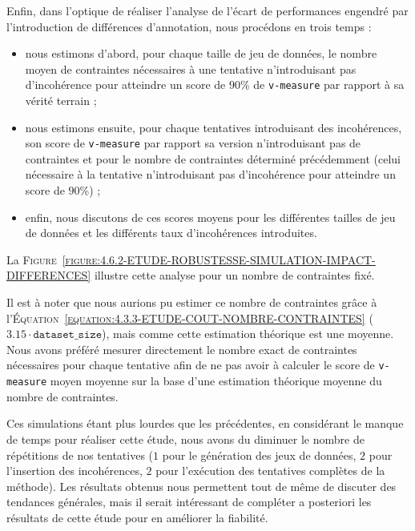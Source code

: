 			Enfin, dans l'optique de réaliser l'analyse de l'écart de performances engendré par l'introduction de différences d'annotation, nous procédons en trois temps :
			\begin{itemize}
				\item nous estimons d'abord, pour chaque taille de jeu de données, le nombre moyen de contraintes nécessaires à une tentative n'introduisant pas d'incohérence pour atteindre un score de $90$\% de \texttt{v-measure} par rapport à sa vérité terrain ;
				\item nous estimons ensuite, pour chaque tentatives introduisant des incohérences, son score de \texttt{v-measure} par rapport sa version n'introduisant pas de contraintes et pour le nombre de contraintes déterminé précédemment (celui nécessaire à la tentative n'introduisant pas d'incohérence pour atteindre un score de $90$\%) ;
				\item enfin, nous discutons de ces scores moyens pour les différentes tailles de jeu de données et les différents taux d'incohérences introduites.
			\end{itemize}
			La \textsc{Figure~\ref{figure:4.6.2-ETUDE-ROBUSTESSE-SIMULATION-IMPACT-DIFFERENCES}} illustre cette analyse pour un nombre de contraintes fixé.
			
			\begin{leftBarAuthorOpinion}
				Il est à noter que nous aurions pu estimer ce nombre de contraintes grâce à l'\textsc{Équation~\ref{equation:4.3.3-ETUDE-COUT-NOMBRE-CONTRAINTES}} ($3.15 \cdot \texttt{dataset\_size}$), mais comme cette estimation théorique est une moyenne.
				Nous avons préféré mesurer directement le nombre exact de contraintes nécessaires pour chaque tentative afin de ne pas avoir à calculer le score de \texttt{v-measure} moyen moyenne sur la base d'une estimation théorique moyenne du nombre de contraintes.
			\end{leftBarAuthorOpinion}
			
			\begin{leftBarWarning}
				Ces simulations étant plus lourdes que les précédentes, en considérant le manque de temps pour réaliser cette étude, nous avons du diminuer le nombre de répétitions de nos tentatives ($1$ pour le génération des jeux de données, $2$ pour l'insertion des incohérences, $2$ pour l’exécution des tentatives complètes de la méthode).
				Les résultats obtenus nous permettent tout de même de discuter des tendances générales, mais il serait intéressant de compléter a posteriori les résultats de cette étude pour en améliorer la fiabilité.
			\end{leftBarWarning}
			
